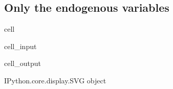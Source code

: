 \documentclass[letterpaper,10pt,english]{jupyterBook}
\begin{document}
\subsection{Only the endogenous variables}
\label{\detokenize{content/howto/smallmodel/modelstart:only-the-endogenous-variables}}
\begin{sphinxuseclass}{cell}\begin{sphinxVerbatimInput}

\begin{sphinxuseclass}{cell_input}
\begin{sphinxVerbatim}[commandchars=\\\{\}]
\end{sphinxVerbatim}

\end{sphinxuseclass}\end{sphinxVerbatimInput}
\begin{sphinxVerbatimOutput}

\begin{sphinxuseclass}{cell_output}
\begin{sphinxVerbatim}[commandchars=\\\{\}]
\PYGZlt{}IPython.core.display.SVG object\PYGZgt{}
\end{sphinxVerbatim}

\end{sphinxuseclass}\end{sphinxVerbatimOutput}

\end{sphinxuseclass}
\end{document}
